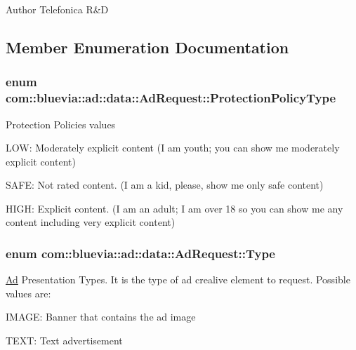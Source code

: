 \begin{DoxyAuthor}{Author}
Telefonica R\&D 
\end{DoxyAuthor}


\subsection{Member Enumeration Documentation}
\hypertarget{classcom_1_1bluevia_1_1ad_1_1data_1_1AdRequest_abd707475c19957f294689451d338c099}{
\subsubsection[{ProtectionPolicyType}]{\setlength{\rightskip}{0pt plus 5cm}enum {\bf com::bluevia::ad::data::AdRequest::ProtectionPolicyType}}}
\label{classcom_1_1bluevia_1_1ad_1_1data_1_1AdRequest_abd707475c19957f294689451d338c099}
Protection Policies values 
\begin{DoxyItemize}
\item LOW: Moderately explicit content (I am youth; you can show me moderately explicit content) 
\item SAFE: Not rated content. (I am a kid, please, show me only safe content) 
\item HIGH: Explicit content. (I am an adult; I am over 18 so you can show me any content including very explicit content) 
\end{DoxyItemize}\hypertarget{classcom_1_1bluevia_1_1ad_1_1data_1_1AdRequest_a09c6520d8fe767e50b3629a4a3583ef3}{
\subsubsection[{Type}]{\setlength{\rightskip}{0pt plus 5cm}enum {\bf com::bluevia::ad::data::AdRequest::Type}}}
\label{classcom_1_1bluevia_1_1ad_1_1data_1_1AdRequest_a09c6520d8fe767e50b3629a4a3583ef3}
\hyperlink{classcom_1_1bluevia_1_1ad_1_1data_1_1Ad}{Ad} Presentation Types. It is the type of ad crealive element to request. Possible values are: 
\begin{DoxyItemize}
\item IMAGE: Banner that contains the ad image 
\item TEXT: Text advertisement 
\end{DoxyItemize}

